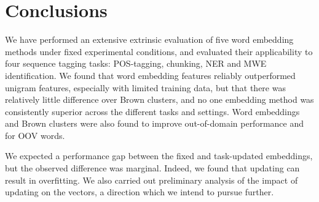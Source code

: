 \section{Conclusions}

We have performed an extensive extrinsic evaluation of five word embedding methods
under fixed experimental conditions, and evaluated their applicability to four sequence tagging tasks: POS-tagging, chunking, NER and MWE identification.
We found that word embedding features reliably outperformed unigram
features, especially with limited training data, but that there was
relatively little difference over Brown clusters, and
no one embedding method was consistently superior across the different tasks and settings.
Word embeddings and Brown clusters were also found to improve
out-of-domain performance and for OOV words.

We expected a performance gap between the fixed and task-updated embeddings, but the observed difference was marginal.
Indeed, we found that updating can result in overfitting.
We also carried out preliminary analysis of the impact of updating on
the vectors, a direction which we intend to pursue further.



